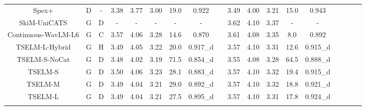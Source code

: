 \documentclass[conference]{IEEEtran}
\begin{document}
\begin{table}
\begin{center}
\begin{tabular}{cccccccccccccccccc}
  Spex+\cite{spex_plus}                   & D                                             & -                                                                                  & 3.38        & 3.77       & 3.00       & 19.0            & 0.922     &          & 3.49        & 4.00       & 3.21       & 15.0            & 0.943             \\
  SkiM-UniCATS\cite{gen_tse}                   & G                                             & D                                                                                  & -        & -      & -       & -            & -     &          & 3.62        & 4.10       & 3.37       & -            & -             \\ \hline
  Continuous-WavLM-L6     & G                                             & C                                                                                  & 3.57        & 4.06       & 3.28       & 14.6            & 0.870     &          & 3.61        & 4.08       & 3.35       & 8.0            & 0.892             \\
  TSELM-L-Hybrid          & G                                             & H                                                                                     & 3.49        & 4.05       & 3.22       & 20.0            & 0.917\_d  &          & 3.57        & 4.10       & 3.31       & 12.6            & 0.915\_d             \\
  TSELM-S-NoCat       & G                                             & D                                                                                   & 3.48        & 4.02       & 3.19       & 71.5            & 0.854\_d    &        & 3.55        & 4.08       & 3.28       & 64.5            & 0.888\_d         \\ \hline
  TSELM-S                 & G                                             & D                                                                                    & 3.50        & 4.06       & 3.23       & 28.1            & 0.883\_d      &      & 3.57        & 4.10       & 3.32       & 19.4            & 0.915\_d            \\
  TSELM-M                 & G                                             & D                                                                                   & 3.49        & 4.04       & 3.21       & 29.0            & 0.892\_d    &        & 3.57        & 4.10       & 3.32       & 18.8            & 0.921\_d             \\
  TSELM-L                 & G                                             & D                                                                                  & 3.49        & 4.04       & 3.21       & 27.5            & 0.895\_d    &        & 3.57        & 4.10       & 3.31       & 17.8            & 0.924\_d        \\
  \Xhline{2\arrayrulewidth} %
  \end{tabular}
  \label{main_exp}
\end{center}
\vspace{-15.5pt}
  \end{table}
\end{document}
